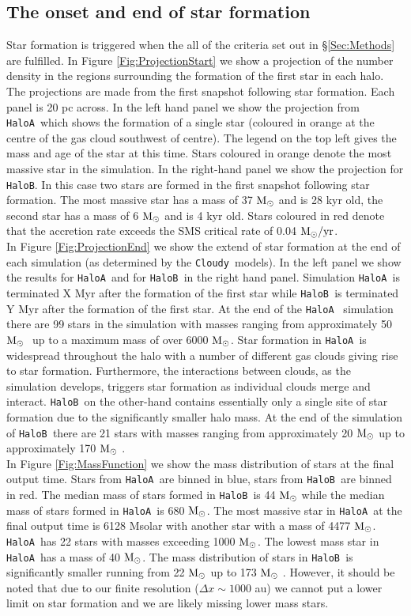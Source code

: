 \documentclass[graphics, twocolumn, usenatbib]{mn2e}
\newcommand{\cloudy}{\texttt{Cloudy~}}
\newcommand{\msolar} {$\rm{M_{\odot}}~$}
\newcommand{\msolarc} {$\rm{M_{\odot}}$}
\newcommand{\msolaryrc} {$\rm{M_{\odot}/yr}$}
\newcommand{\ha} {\texttt{HaloA~}}
\newcommand{\hb} {\texttt{HaloB~}}
\newcommand{\hbc} {\texttt{HaloB}}
\begin{document}
\subsection{The onset and end of star formation}
Star formation is triggered when the all of the criteria set out in \S \ref{Sec:Methods} are
fulfilled. In Figure \ref{Fig:ProjectionStart} we show a projection of the number density in the
regions surrounding the formation of the first star in each halo. The projections are made from the
first snapshot following star formation. Each panel is 20 pc across. In the left hand panel we
show the projection from \ha which shows the formation of a single star (coloured in orange
at the centre of the gas cloud southwest of centre). The legend on the top left gives the mass and
age of the star at this time. Stars coloured in orange denote the most massive star in the simulation.
In the right-hand panel we show the projection for \hbc. In this case two stars are formed in the first
snapshot following star formation. The most massive star has a mass of 37 \msolar and is 28 kyr old,
the second star has a mass of 6 \msolar and is 4 kyr old. Stars coloured in red denote that the
accretion rate exceeds the SMS critical rate of 0.04 \msolaryrc. \\
\indent In Figure \ref{Fig:ProjectionEnd} we show the extend of star formation at the end of each
simulation (as determined by the \cloudy models). In the left panel we show the results for \ha and
for \hb in the right hand panel. Simulation \ha is terminated X Myr after the formation of the first
star while \hb is terminated Y Myr after the formation of the first star. At the end of the \ha
simulation there are 99 stars in the simulation with masses ranging from approximately 50 \msolar
up to a maximum mass of over 6000 \msolarc.  Star formation in \ha is widespread throughout the
halo with a number of different gas clouds giving rise to star formation. Furthermore, the
interactions between clouds, as the simulation develops, triggers star formation as individual clouds
merge and interact. \hb on the other-hand contains essentially only a single site of star formation
due to the significantly smaller halo mass. At the end of the simulation of \hb there are 21 stars
with masses ranging from approximately 20 \msolar up to approximately 170 \msolar.\\
\indent In Figure \ref{Fig:MassFunction} we show the mass distribution of stars at the final
output time. Stars from \ha are binned in blue, stars from \hb are binned in red. The median mass
of stars formed in \hb is 44 \msolar while the median mass of stars formed in \ha is 680 \msolarc.
The most massive star in \ha at the final output time is 6128 Msolar with another star with a mass
of 4477 \msolarc. \ha has 22 stars with masses exceeding 1000 \msolarc. The lowest mass star in
\ha has a mass of 40 \msolarc. The mass distribution of stars in \hb is significantly smaller running
from 22 \msolar up to 173 \msolar. However, it should be noted that due to our finite resolution
($\Delta x \sim 1000$ au) we cannot put a lower limit on star formation and we are likely missing
lower mass stars. 
\end{document}
